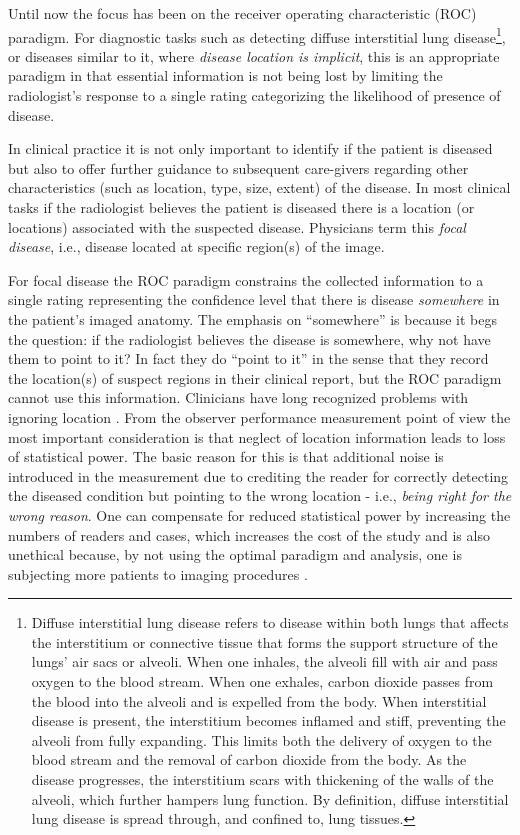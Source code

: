 \documentclass[
]{book}
\begin{document}
Until now the focus has been on the receiver operating characteristic (ROC) paradigm. For diagnostic tasks such as detecting diffuse interstitial lung disease\footnote{Diffuse interstitial lung disease refers to disease within both lungs that affects the interstitium or connective tissue that forms the support structure of the lungs' air sacs or alveoli. When one inhales, the alveoli fill with air and pass oxygen to the blood stream. When one exhales, carbon dioxide passes from the blood into the alveoli and is expelled from the body. When interstitial disease is present, the interstitium becomes inflamed and stiff, preventing the alveoli from fully expanding. This limits both the delivery of oxygen to the blood stream and the removal of carbon dioxide from the body. As the disease progresses, the interstitium scars with thickening of the walls of the alveoli, which further hampers lung function. By definition, diffuse interstitial lung disease is spread through, and confined to, lung tissues.}, or diseases similar to it, where \emph{disease location is implicit}, this is an appropriate paradigm in that essential information is not being lost by limiting the radiologist's response to a single rating categorizing the likelihood of presence of disease.

In clinical practice it is not only important to identify if the patient is diseased but also to offer further guidance to subsequent care-givers regarding other characteristics (such as location, type, size, extent) of the disease. In most clinical tasks if the radiologist believes the patient is diseased there is a location (or locations) associated with the suspected disease. Physicians term this \emph{focal disease}, i.e., disease located at specific region(s) of the image.

For focal disease the ROC paradigm constrains the collected information to a single rating representing the confidence level that there is disease \emph{somewhere} in the patient's imaged anatomy. The emphasis on ``somewhere'' is because it begs the question: if the radiologist believes the disease is somewhere, why not have them to point to it? In fact they do ``point to it'' in the sense that they record the location(s) of suspect regions in their clinical report, but the ROC paradigm cannot use this information. Clinicians have long recognized problems with ignoring location \citep{BlackDwyer1990, RN1921}. From the observer performance measurement point of view the most important consideration is that neglect of location information leads to loss of statistical power. The basic reason for this is that additional noise is introduced in the measurement due to crediting the reader for correctly detecting the diseased condition but pointing to the wrong location - i.e., \emph{being right for the wrong reason}. One can compensate for reduced statistical power by increasing the numbers of readers and cases, which increases the cost of the study and is also unethical because, by not using the optimal paradigm and analysis, one is subjecting more patients to imaging procedures \citep{RN2662}.
\end{document}
